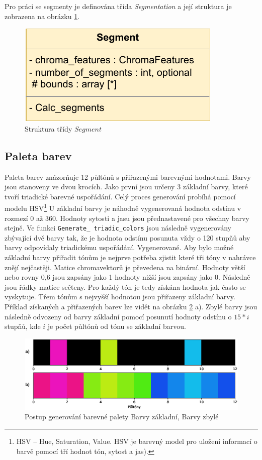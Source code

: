 Pro práci se segmenty je definována třída \textit{Segmentation} a její struktura je zobrazena na obrázku \ref{fig:Segmentation_diagram}.

\begin{figure}[H]
    \centering
    \includegraphics[width = 0.3\linewidth]{obrazky/UML_diagram_Segmentation.pdf}
    \caption{Struktura třídy $Segment$}
    \label{fig:Segmentation_diagram}
\end{figure}


\subsection{Paleta barev} \label{sec:Color_palete}

Paleta barev znázorňuje 12 půltónů s přiřazenými barevnými hodnotami. Barvy jsou stanoveny ve dvou krocích. Jako první jsou určeny 3 základní barvy, které tvoří triadické barevné uspořádání. Celý proces generování probíhá pomocí modelu \acs{HSV}\footnote{HSV -- Hue, Saturation, Value. HSV je barevný model pro uložení informací o barvě pomocí tří hodnot tón, sytost a jas).} U základní barvy je náhodně vygenerovaná hodnota odstínu v rozmezí 0 až 360. Hodnoty sytosti a jasu jsou přednastavené pro všechny barvy stejně. Ve funkci \texttt{Generate\_ triadic\_colors} jsou následně vygenerovány zbývající dvě barvy tak, že je hodnota odstínu posunuta vždy o 120 stupňů aby barvy odpovídaly triadickému uspořádání. Vygenerované. Aby bylo možné základní barvy přiřadit tónům je nejprve potřeba zjistit které tři tóny v nahrávce znějí nejčastěji. Matice chromavektorů je převedena na binární. Hodnoty větší nebo rovny 0,6 jsou zapsány jako 1 hodnoty nižší jsou zapsány jako 0. Následně jsou řádky matice sečteny. Pro každý tón je tedy získána hodnota jak často se vyskytuje. Třem tónům s nejvyšší hodnotou jsou přiřazeny základní barvy. Příklad získaných a přiřazených barev lze vidět na obrázku \ref{fig:Color_palete} a). Zbylé barvy jsou následně odvozeny od barvy základní pomocí posunutí hodnoty odstínu o $15*i$ stupňů, kde $i$ je počet půltónů od tónu se základní barvou.

\begin{figure}[H]
    \centering
    \includegraphics[width = 1\linewidth]{obrazky/Color_palete.eps}
    \caption{Postup generování barevné palety  Barvy základní,  Barvy zbylé}
    \label{fig:Color_palete}
\end{figure}

